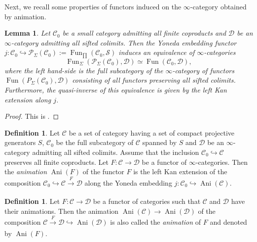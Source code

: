 \documentclass[11pt, a4paper]{amsart}
\theoremstyle{plain}
\newtheorem{lemma}[theorem]{Lemma}
\theoremstyle{definition}
\newtheorem{definition}[theorem]{Definition}
\begin{document}
Next, we recall some properties of functors induced on the $\infty$-category obtained by animation.

\begin{lemma}\label{lem3.9}
    Let $\mathscr C_0$ be a small category admitting all finite coproducts and $\mathscr D$ be an $\infty$-category admitting all sifted colimits. Then the Yoneda embedding functor $j:\mathscr C_0\hookrightarrow \mathscr P _{\Sigma}(\mathscr C_0):=\operatorname{Fun}_{\prod}(\mathscr C_0,\mathcal S)$ induces an equivalence of $\infty$-categories\[\operatorname{Fun}_{\Sigma}(\mathscr P _{\Sigma}(\mathscr C_0),\mathscr D)\simeq \operatorname{Fun}(\mathscr C_0,\mathscr D),\] where the left hand-side is the full subcategory of the $\infty$-category of functors $\operatorname{Fun}(P _{\Sigma}(\mathscr C_0),\mathscr D)$ consisting of all functors preserving all sifted colimits.
    Furthermore, the quasi-inverse of this equivalence is given by the left Kan extension along $j$.
\end{lemma}
\begin{proof}
    This is \cite[Proposition 5.5.8.15]{Lur09}.
\end{proof}

\begin{definition}\label{def3.10}
    Let $\mathscr C$ be a set of category having a set of compact projective generators $S$, $\mathscr C_0$ be the full subcategory of $\mathscr C$ spanned by $S$ and $\mathscr D$ be an $\infty$-category admitting all sifted colimits. Assume that the inclusion $\mathscr C_0\hookrightarrow \mathscr C$ preserves all finite coproducts. Let $F:\mathscr C\to \mathscr D$ be a functor of $\infty$-categories. Then the {\em animation} $\operatorname{Ani}(F)$  of the functor $F$ is the left Kan extension of the composition $\mathscr C_0\hookrightarrow \mathscr C\xrightarrow[]{F}\mathscr D$ along the Yoneda embedding $j:\mathscr C_0\hookrightarrow \operatorname{Ani}(\mathscr C)$.
\end{definition}
\begin{definition}\label{def3.11}
    Let $F:\mathscr C\to \mathscr D$ be a functor of categories such that $\mathscr C$ and $\mathscr D$ have their animations. Then the animation $\operatorname{Ani}(\mathscr C)\to \operatorname{Ani}(\mathscr D)$ of the composition $\mathscr C\xrightarrow[]{F}\mathscr D\hookrightarrow \operatorname{Ani}(\mathscr D)$ is also called the {\em animation} of $F$ and denoted by $\operatorname{Ani}(F)$.
\end{definition}
\end{document}
